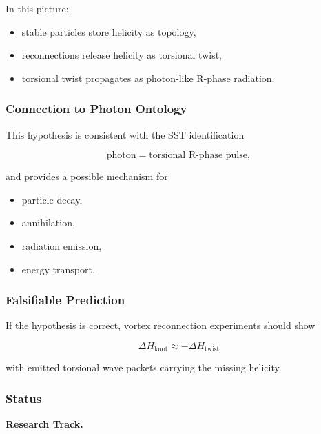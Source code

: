         In this picture:
        
        \begin{itemize}
            \item stable particles store helicity as topology,
            \item reconnections release helicity as torsional twist,
            \item torsional twist propagates as photon-like R-phase radiation.
        \end{itemize}
    
    \subsubsection{Connection to Photon Ontology}
        
        This hypothesis is consistent with the SST identification
        
        \[
            \text{photon}
            =
            \text{torsional R-phase pulse},
        \]
        
        and provides a possible mechanism for
        
        \begin{itemize}
            \item particle decay,
            \item annihilation,
            \item radiation emission,
            \item energy transport.
        \end{itemize}
    
    \subsubsection{Falsifiable Prediction}
        
        If the hypothesis is correct, vortex reconnection experiments should show
        
        \[
            \Delta H_{\mathrm{knot}}
            \approx
            -
            \Delta H_{\mathrm{twist}}
        \]
        
        with emitted torsional wave packets carrying the missing helicity.
    
    \subsubsection{Status}
        
        \textbf{Research Track.}
        
